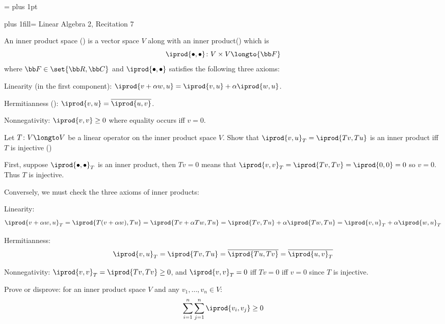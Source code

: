 


\parindent=\z@
\parskip=3pt plus 1pt


{\vbox{\leftskip=0pt plus 1fill\relax\rightskip=\leftskip{}%
Linear Algebra 2, Recitation 7
}}

\bdefn

    An {\emphcolor inner product space} () is a vector space $V$ along with an {\emphcolor inner product}\hfill\break() which is
    $$ \iprod{\bullet,\bullet}\colon V\times V\longto{\bb F} $$
    where ${\bb F}\in\set{{\bb R},{\bb C}}$ and $\iprod{\bullet,\bullet}$ satisfies the following three axioms:
    \benum
        \item Linearity (in the first component): $\iprod{v+\alpha w,u}=\iprod{v,u}+\alpha\iprod{w,u}$.
        \item Hermitianness (): $\iprod{v,u}=\overline{\iprod{u,v}}$.
        \item Nonnegativity: $\iprod{v,v}\geq0$ where equality occurs iff $v=0$.
    \eenum

\edefn

\bexerc

    Let $T\colon V\longto V$ be a linear operator on the inner product space $V$.
    Show that $\iprod{v,u}_T=\iprod{Tv,Tu}$ is an inner product iff $T$ is injective ()

\eexerc

First, suppose $\iprod{\bullet,\bullet}_T$ is an inner product, then $Tv=0$ means that $\iprod{v,v}_T=\iprod{Tv,Tv}=\iprod{0,0}=0$ so $v=0$.
Thus $T$ is injective.

Conversely, we must check the three axioms of inner products:
\benum
    \item Linearity:
    $$ \iprod{v+\alpha w,u}_T = \iprod{T(v+\alpha w),Tu} = \iprod{Tv+\alpha Tw,Tu} = \iprod{Tv,Tu} + \alpha\iprod{Tw,Tu} = \iprod{v,u}_T + \alpha\iprod{w,u}_T $$
    \item Hermitianness:
    $$ \iprod{v,u}_T = \iprod{Tv,Tu} = \overline{\iprod{Tu,Tv}} = \overline{\iprod{u,v}_T} $$
    \item Nonnegativity: $\iprod{v,v}_T=\iprod{Tv,Tv}\geq0$, and $\iprod{v,v}_T=0$ iff $Tv=0$ iff $v=0$ since $T$ is injective.
\eenum
\qqed

\bexerc

    Prove or disprove: for an inner product space $V$ and any $v_1,\dots,v_n\in V$:
    $$ \sum_{i=1}^n\sum_{j=1}^n\iprod{v_i,v_j} \geq 0 $$

